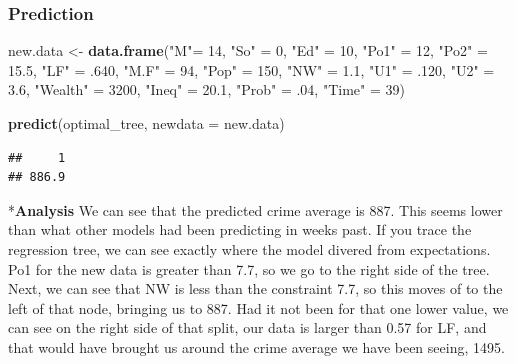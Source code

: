 \documentclass[]{article}
\newenvironment{Shaded}{\begin{snugshade}}{\end{snugshade}}
\newcommand{\KeywordTok}[1]{\textcolor[rgb]{0.13,0.29,0.53}{\textbf{#1}}}
\newcommand{\DataTypeTok}[1]{\textcolor[rgb]{0.13,0.29,0.53}{#1}}
\newcommand{\DecValTok}[1]{\textcolor[rgb]{0.00,0.00,0.81}{#1}}
\newcommand{\FloatTok}[1]{\textcolor[rgb]{0.00,0.00,0.81}{#1}}
\newcommand{\StringTok}[1]{\textcolor[rgb]{0.31,0.60,0.02}{#1}}
\newcommand{\NormalTok}[1]{#1}
\begin{document}
\subsubsection{Prediction}\label{prediction}

\begin{Shaded}
\begin{Highlighting}[]
\NormalTok{new.data <-}\StringTok{ }\KeywordTok{data.frame}\NormalTok{(}\StringTok{"M"}\NormalTok{=}\StringTok{ }\DecValTok{14}\NormalTok{,}
\StringTok{"So"}\NormalTok{ =}\StringTok{ }\DecValTok{0}\NormalTok{,}
\StringTok{"Ed"}\NormalTok{ =}\StringTok{ }\DecValTok{10}\NormalTok{,}
\StringTok{"Po1"}\NormalTok{ =}\StringTok{ }\DecValTok{12}\NormalTok{,}
\StringTok{"Po2"}\NormalTok{ =}\StringTok{ }\FloatTok{15.5}\NormalTok{,}
\StringTok{"LF"}\NormalTok{ =}\StringTok{ }\NormalTok{.}\DecValTok{640}\NormalTok{,}
\StringTok{"M.F"}\NormalTok{ =}\StringTok{ }\DecValTok{94}\NormalTok{,}
\StringTok{"Pop"}\NormalTok{ =}\StringTok{ }\DecValTok{150}\NormalTok{,}
\StringTok{"NW"}\NormalTok{ =}\StringTok{ }\FloatTok{1.1}\NormalTok{,}
\StringTok{"U1"}\NormalTok{ =}\StringTok{ }\NormalTok{.}\DecValTok{120}\NormalTok{,}
\StringTok{"U2"}\NormalTok{ =}\StringTok{ }\FloatTok{3.6}\NormalTok{,}
\StringTok{"Wealth"}\NormalTok{ =}\StringTok{ }\DecValTok{3200}\NormalTok{,}
\StringTok{"Ineq"}\NormalTok{ =}\StringTok{ }\FloatTok{20.1}\NormalTok{,}
\StringTok{"Prob"}\NormalTok{ =}\StringTok{ }\NormalTok{.}\DecValTok{04}\NormalTok{,}
\StringTok{"Time"}\NormalTok{ =}\StringTok{ }\DecValTok{39}\NormalTok{)}

\KeywordTok{predict}\NormalTok{(optimal_tree, }\DataTypeTok{newdata =}\NormalTok{ new.data)}
\end{Highlighting}
\end{Shaded}

\begin{verbatim}
##     1 
## 886.9
\end{verbatim}

*\textbf{Analysis} We can see that the predicted crime average is 887.
This seems lower than what other models had been predicting in weeks
past. If you trace the regression tree, we can see exactly where the
model divered from expectations. Po1 for the new data is greater than
7.7, so we go to the right side of the tree. Next, we can see that NW is
less than the constraint 7.7, so this moves of to the left of that node,
bringing us to 887. Had it not been for that one lower value, we can see
on the right side of that split, our data is larger than 0.57 for LF,
and that would have brought us around the crime average we have been
seeing, 1495.
\end{document}
